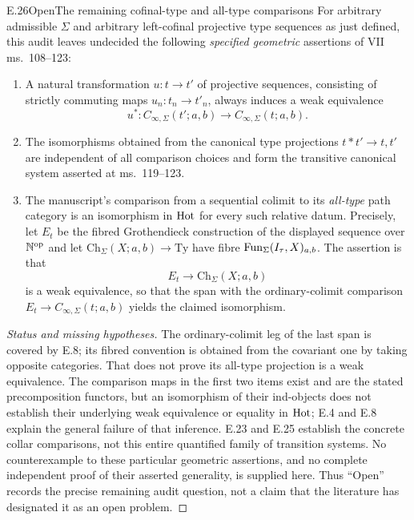 \begin{claim}{E.26}{Open}{The remaining cofinal-type and all-type comparisons}
For arbitrary admissible $\Sigma$ and arbitrary left-cofinal projective type sequences as just defined, this audit leaves undecided the following \emph{specified geometric} assertions of VII ms.~108--123:
\begin{enumerate}
\item A natural transformation $u:t\to t'$ of projective sequences, consisting of strictly commuting maps $u_n:t_n\to t'_n$, always induces a weak equivalence
\[
 u^*:C_{\infty,\Sigma}(t';a,b)\longrightarrow
                  C_{\infty,\Sigma}(t;a,b).
\]
\item The isomorphisms obtained from the canonical type projections $t*t'\to t,t'$ are independent of all comparison choices and form the transitive canonical system asserted at ms.~119--123.
\item The manuscript's comparison from a sequential colimit to its \emph{all-type} path category is an isomorphism in $\mathrm{Hot}$ for every such relative datum. Precisely, let $E_t$ be the fibred Grothendieck construction of the displayed sequence over $\mathbb N^{\mathrm{op}}$ and let $\mathrm{Ch}_\Sigma(X;a,b)\to\mathrm{Ty}$ have fibre $\operatorname{Fun}_\Sigma(I_\tau,X)_{a,b}$. The assertion is that
\[
 E_t\longrightarrow\mathrm{Ch}_\Sigma(X;a,b)
\]
is a weak equivalence, so that the span with the ordinary-colimit comparison $E_t\to C_{\infty,\Sigma}(t;a,b)$ yields the claimed isomorphism.
\end{enumerate}
\end{claim}
\begin{proof}[Status and missing hypotheses]
The ordinary-colimit leg of the last span is covered by E.8; its fibred convention is obtained from the covariant one by taking opposite categories. That does not prove its all-type projection is a weak equivalence. The comparison maps in the first two items exist and are the stated precomposition functors, but an isomorphism of their ind-objects does not establish their underlying weak equivalence or equality in $\mathrm{Hot}$; E.4 and E.8 explain the general failure of that inference. E.23 and E.25 establish the concrete collar comparisons, not this entire quantified family of transition systems. No counterexample to these particular geometric assertions, and no complete independent proof of their asserted generality, is supplied here. Thus ``Open'' records the precise remaining audit question, not a claim that the literature has designated it as an open problem.
\end{proof}

